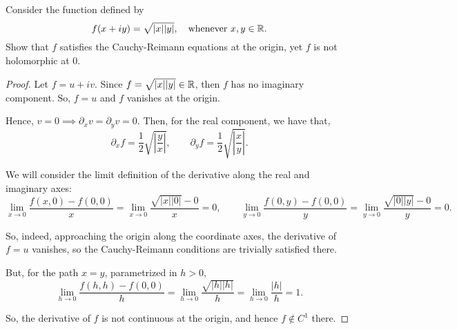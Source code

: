 \documentclass[../hw1]{subfiles}
\begin{document}
\begin{problem}
Consider the function defined by \[
	f(x+iy)=\sqrt{|x||y|},\quad \text{whenever } x,y \in \mathbb{R}
	.\]
Show that $f$ satisfies the Cauchy-Reimann equations at the origin, yet $f$ is not holomorphic at 0.
\end{problem}
\begin{proof}
	Let $f=u+iv$.
	Since $f=\sqrt{|x| |y|}\in \mathbb{R}$, then $f$ has no imaginary component.
	So, $f=u$ and $f$ vanishes at the origin.

	Hence, $v=0 \implies \partial_x v = \partial_y v = 0 $.
	Then, for the real component, we have that,  \[
		\partial_x f  = \frac{1}{2}\sqrt{\left| \frac{y}{x} \right| } ,\qquad
		\partial_y f = \frac{1}{2}\sqrt{\left| \frac{x}{y} \right| }
		.\]

	We will consider the limit definition of the derivative along the real and imaginary axes: \[
		\lim_{x \to 0} \frac{f(x,0)-f(0,0)}{x} = \lim_{x \to 0} \frac{\sqrt{|x||0|}-0}{x} = 0, \qquad
		\lim_{y \to 0} \frac{f(0,y)-f(0,0)}{y} = \lim_{y \to 0} \frac{\sqrt{|0||y|}-0}{y} = 0
		.\]

	So, indeed, approaching the origin along the coordinate axes, the derivative of $f=u$ vanishes, so the Cauchy-Reimann conditions are trivially satisfied there.

	But, for the path $x=y$, parametrized in $h>0$, \[
		\lim_{h \to 0} \frac{f(h,h)-f(0,0)}{h} = \lim_{h \to 0} \frac{\sqrt{|h||h|}}{h} = \lim_{h \to 0} \frac{|h|}{h} = 1
		.\]

	So, the derivative of $f$ is not continuous at the origin, and hence $f\not\in C^1$ there.
\end{proof}
\end{document}
